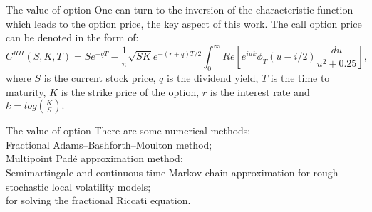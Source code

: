             \begin{frame}{The value of option}
                \>\>\>One can turn to the inversion of the characteristic function which leads to the option price, the key aspect of this work. The call option price can be denoted in the form of:\\
                $$C^{RH}(S, K, T) = Se^{-qT} - \frac{1}{\pi}\sqrt{SK}e^{-(r + q)T/2}\int_{0}^{\infty}Re[e^{iuk}\phi_T(u - i/2)\frac{du}{u^2 + 0.25}],$$
                where $S$ is the current stock price, $q$ is the dividend yield, $T$ is the time to maturity, $K$ is the strike price of the option, $r$ is the interest rate and $k = log(\frac{K}{S}).$ 
            \end{frame}
            \begin{frame}{The value of option}
                There are some numerical methods:\\ 
                \>\>\> Fractional Adams–Bashforth–Moulton method;\\
                \>\>\> Multipoint Padé approximation method;\\
                \>\>\> Semimartingale and continuous-time Markov chain approximation for rough stochastic local volatility models;\\
                for solving the fractional Riccati equation. 
            \end{frame}
